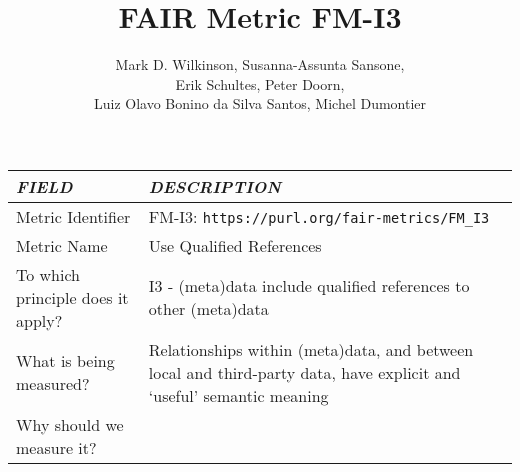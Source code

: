 \documentclass[english]{article}
\begin{document}
\title{FAIR Metric FM-I3}

\author{Mark D. Wilkinson, Susanna-Assunta Sansone, \\Erik Schultes, Peter Doorn,\\ 
Luiz Olavo Bonino da Silva Santos, Michel Dumontier}

\maketitle

\newpage





\begin{longtable}{|p{5cm}|p{9cm}|}


\hline
\emph{FIELD} & \emph{DESCRIPTION} \\
\hline
Metric Identifier &   FM-I3: \verb"https://purl.org/fair-metrics/FM_I3"
\\


\hline
Metric Name &   



Use Qualified References


 \\



\hline
To which principle does it apply? &   


I3 - (meta)data include qualified references to other (meta)data

\\



\hline
What is being measured? & 


Relationships within (meta)data, and between local and third-party data, have explicit and ‘useful’ semantic meaning


\\



\hline
Why should we measure it? & 



\end{longtable}
\end{document}

